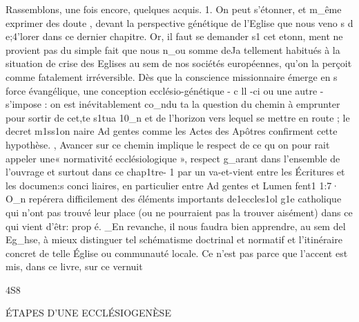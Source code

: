 {Rassemblons, une fois encore, quelques acquis.
1.	On peut s'étonner, et m_ême exprimer des doute , devant la perspective génétique de l'Eglise que nous veno s d e;4'lorer dans ce dernier chapitre. Or, il faut se demander s1 cet etonn, ment ne provient pas du simple fait que nous n_ou somme deJa tellement habitués à la situation de crise des Eglises au sem de nos sociétés européennes, qu'on la perçoit comme fatalement irréversible. Dès que la conscience missionnaire émerge en s force évangélique, une conception ecclésio-génétique -	c ll -ci ou une autre -	s'impose : on est inévitablement co_ndu ta la question du chemin à emprunter pour sortir de cet,te s1tua 10_n et de l'horizon vers lequel se mettre en route ; le decret m1ss1on­ naire Ad gentes comme les Actes des Apôtres confirment cette
hypothèse.	,
Avancer sur ce chemin implique le respect de ce qu on pour
rait appeler une« normativité ecclésiologique », respect g_arant dans l'ensemble de l'ouvrage et surtout dans ce chap1tre- 1 par un va-et-vient entre les Écritures et les documen:s conci­
liaires, en particulier entre Ad gentes et Lumen fent1 1:7· O_n repérera difficilement des éléments importants de1eccles1ol g1e catholique qui n'ont pas trouvé leur place (ou ne pourraient pas la trouver aisément) dans ce qui vient d'êtr: prop é. _En revanche, il nous faudra bien apprendre, au sem del  Eg_hse, à mieux distinguer tel schématisme doctrinal et normatif et l'itinéraire concret de telle Église ou communauté locale. Ce n'est pas parce que l'accent est mis, dans ce livre, sur ce vernuit

4S8
 
ÉTAPES D'UNE ECCLÉSIOGENÈSE

}
